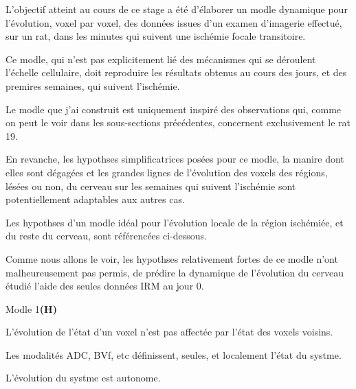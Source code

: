 L'objectif atteint au cours de ce stage a \'et\'e d'\'elaborer un modle dynamique pour l'\'evolution, voxel par voxel, %
des donn\'ees issues d'un examen d'imagerie effectu\'e, sur un rat, dans les minutes qui suivent une isch\'emie focale transitoire.

\par
Ce modle, qui n'est pas explicitement li\'e  des m\'ecanismes qui se d\'eroulent  l'\'echelle cellulaire, %
doit reproduire les r\'esultats obtenus au cours des jours, et des premires semaines, qui suivent l'isch\'emie.

\par
Le modle que j'ai construit est uniquement inspir\'e des observations qui, comme on peut le voir dans les sous-sections pr\'ec\'edentes, %
concernent exclusivement le rat 19.

\par
En revanche, les hypothses simplificatrices pos\'ees pour ce modle, la manire dont elles sont d\'egag\'ees %
et les grandes lignes de l'\'evolution des voxels des r\'egions, l\'es\'ees ou non, du cerveau sur les semaines qui suivent l'isch\'emie %
sont potentiellement adaptables aux autres cas.

\etoile

Les hypothses d'un modle \og{} id\'eal\fg{} pour l'\'evolution locale de la r\'egion isch\'emi\'ee, et du reste du cerveau, %
sont r\'ef\'erenc\'ees ci-dessous.

\par
Comme nous allons le voir, les hypothses relativement fortes de ce modle n'ont malheureusement pas permis, %
de pr\'edire la dynamique de l'\'evolution du cerveau \'etudi\'e  l'aide des seules donn\'ees IRM au jour 0.


\begin{modmerate}{Modle 1}{\textbf{(H\arabic*)}}
\item\label{nprog} L'\'evolution de l'\'etat d'un voxel n'est pas affect\'ee par l'\'etat des voxels voisins.
\item\label{var_comp} Les modalit\'es ADC, BVf, etc d\'efinissent, seules, et localement l'\'etat du systme.
\item\label{auto} L'\'evolution du systme est autonome.
\end{modmerate}

